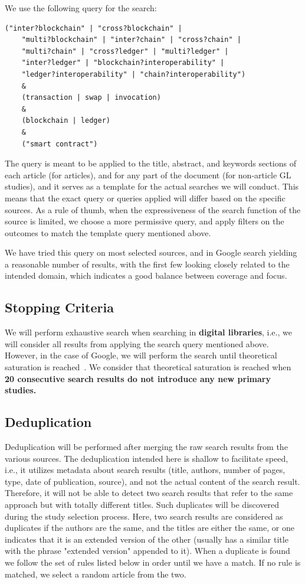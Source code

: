 \documentclass[review]{elsarticle}
\begin{document}
We use the following query for the search:
\begin{lstlisting}[caption={The query term used to search for primary and secondary studies.},label={lst:query-string}]
	("inter?blockchain" | "cross?blockchain" | 
	"multi?blockchain" | "inter?chain" | "cross?chain" |
	"multi?chain" | "cross?ledger" | "multi?ledger" | 
	"inter?ledger" | "blockchain?interoperability" | 
	"ledger?interoperability" | "chain?interoperability") 
	& 
	(transaction | swap | invocation)
	&
	(blockchain | ledger)
	&
	("smart contract")
\end{lstlisting}
The query is meant to be applied to the title, abstract, and keywords sections of each article (for articles), and for any part of the document (for non-article GL studies), and it serves as a template for the actual searches we will conduct.
This means that the exact query or queries applied will differ based on the specific sources.
As a rule of thumb, when the expressiveness of the search function of the source is limited, we choose a more permissive query, and apply filters on the outcomes to match the template query mentioned above.

We have tried this query on most selected sources, and in Google search yielding a reasonable number of results, with the first few looking closely related to the intended domain, which indicates a good balance between coverage and focus.

\subsection{Stopping Criteria}
We will perform exhaustive search when searching in \textbf{digital libraries}, i.e., we will consider all results from applying the search query mentioned above.
However, in the case of Google, we will perform the search until theoretical saturation is reached~\cite{Garousi2017MLR}.
We consider that theoretical saturation is reached when \textbf{20 consecutive search results do not introduce any new primary studies.}

\subsection{Deduplication}
Deduplication will be performed after merging the raw search results from the various sources.
The deduplication intended here is shallow to facilitate speed, i.e., it utilizes metadata about search results (title, authors, number of pages, type, date of publication, source), and not the actual content of the search result.
Therefore, it will not be able to detect two search results that refer to the same approach but with totally different titles.
Such duplicates will be discovered during the study selection process.
Here, two search results are considered as duplicates if the authors are the same, and the titles are either the same, or one indicates that it is an extended version of the other (usually has a similar title with the phrase "extended version" appended to it).
When a duplicate is found we follow the set of rules listed below in order until we have a match.
If no rule is matched, we select a random article from the two.
\end{document}
